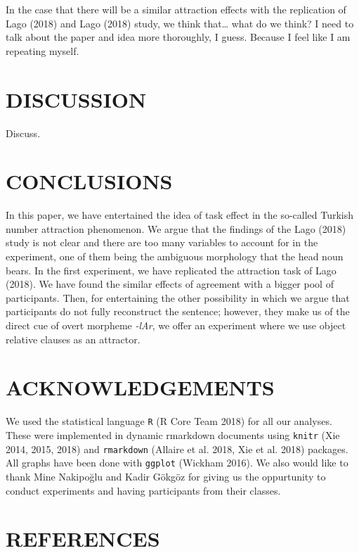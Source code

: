 \documentclass[11pt,a4paper]{article}
\begin{document}
In the case that there will be a similar attraction effects with the
replication of Lago (2018) and Lago (2018) study, we think that\ldots{}
what do we think? I need to talk about the paper and idea more
thoroughly, I guess. Because I feel like I am repeating myself.

\section{DISCUSSION}\label{discussion}

Discuss.

\section{CONCLUSIONS}\label{conclusions}

In this paper, we have entertained the idea of task effect in the
so-called Turkish number attraction phenomenon. We argue that the
findings of the Lago (2018) study is not clear and there are too many
variables to account for in the experiment, one of them being the
ambiguous morphology that the head noun bears. In the first experiment,
we have replicated the attraction task of Lago (2018). We have found the
similar effects of agreement with a bigger pool of participants. Then,
for entertaining the other possibility in which we argue that
participants do not fully reconstruct the sentence; however, they make
us of the direct cue of overt morpheme \emph{-lAr}, we offer an
experiment where we use object relative clauses as an attractor.

\section{ACKNOWLEDGEMENTS}\label{acknowledgements}

We used the statistical language \texttt{R} (R Core Team 2018) for all
our analyses. These were implemented in dynamic rmarkdown documents
using \texttt{knitr} (Xie 2014, 2015, 2018) and \texttt{rmarkdown}
(Allaire et al. 2018, Xie et al. 2018) packages. All graphs have been
done with \texttt{ggplot} (Wickham 2016). We also would like to thank
Mine Nakipo\u{g}lu and Kadir Gökgöz for giving us the oppurtunity to
conduct experiments and having participants from their classes.

\section{REFERENCES}\label{references}
\end{document}
